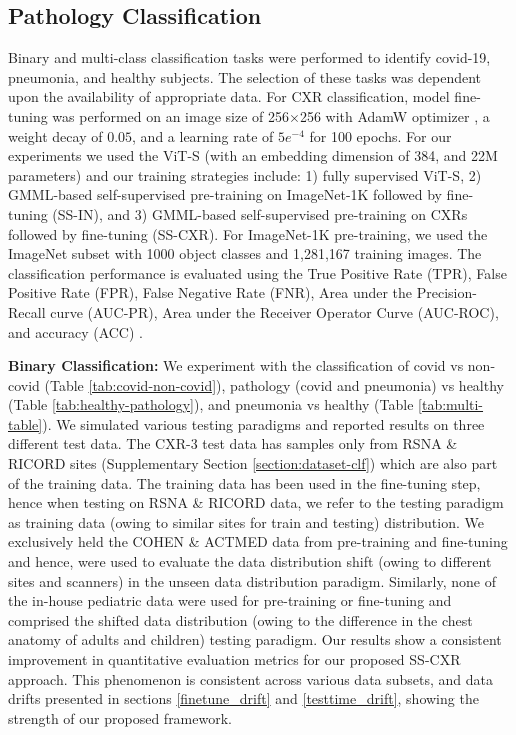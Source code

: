 \documentclass[10pt,journal,compsoc]{IEEEtran}
\begin{document}
\subsection{Pathology Classification}
\label{sec:exp_classification}
Binary and multi-class classification tasks were performed to identify covid-19, pneumonia, and healthy subjects. The selection of these tasks was dependent upon the availability of appropriate data. For CXR classification, model fine-tuning was performed on an image size of 256$\times$256 with AdamW optimizer \cite{adamw}, a weight decay of $0.05$, and a learning rate of ${5e^{-4}}$ for 100 epochs. For our experiments we used the ViT-S (with an embedding dimension of 384, and 22M parameters) and our training strategies include: 1) fully supervised ViT-S, 2) GMML-based self-supervised pre-training on ImageNet-1K followed by fine-tuning (SS-IN), and 3) GMML-based self-supervised pre-training on CXRs followed by fine-tuning (SS-CXR). For ImageNet-1K pre-training, we used the ImageNet subset with 1000 object classes and 1,281,167 training images.  The classification performance is evaluated using the True Positive Rate (TPR), False Positive Rate (FPR), False Negative Rate (FNR), Area under the Precision-Recall curve (AUC-PR), Area under the Receiver Operator Curve (AUC-ROC), and accuracy (ACC) \cite{biship2007pattern}. 

\noindent \textbf{Binary Classification:}
We experiment with the classification of covid vs non-covid (Table \ref{tab:covid-non-covid}), pathology (covid and pneumonia) vs healthy  (Table \ref{tab:healthy-pathology}), and pneumonia vs healthy (Table \ref{tab:multi-table}). We simulated various testing paradigms and reported results on three different test data. The CXR-3 test data has samples only from RSNA \& RICORD sites (Supplementary Section \ref{section:dataset-clf}) which are also part of the training data. The training data has been used in the fine-tuning step, hence when testing on RSNA \& RICORD data, we refer to the testing paradigm as training data (owing to similar sites for train and testing) distribution. We exclusively held the COHEN \& ACTMED data from pre-training and fine-tuning and hence, were used to evaluate the data distribution shift (owing to different sites and scanners) in the unseen data distribution paradigm. Similarly, none of the in-house pediatric data were used for pre-training or fine-tuning and comprised the shifted data distribution (owing to the difference in the chest anatomy of adults and children) testing paradigm. Our results show a consistent improvement in quantitative evaluation metrics for our proposed SS-CXR approach. This phenomenon is consistent across various data subsets, and data drifts presented in sections \ref{finetune_drift} and \ref{testtime_drift}, showing the strength of our proposed framework.
\end{document}
